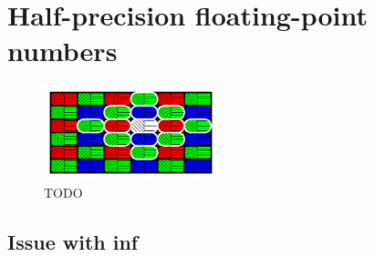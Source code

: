 \section{Half-precision floating-point numbers}





\begin{figure}[H]
    \centering
    \includegraphics[width=0.45\textwidth]{figures/polarized_image/half2_conv.pdf}
    \caption{TODO}
    \label{fig:}
\end{figure}

\subsection{Issue with inf}
